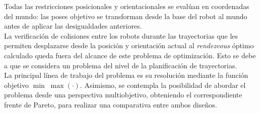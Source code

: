 
Todas las restricciones posicionales y orientacionales se evalúan en coordenadas del mundo:
las poses objetivo se transforman desde la base del robot al mundo antes de aplicar las 
desigualdades anteriores. \\

La verificación de colisiones entre los robots durante las trayectorias que les permiten 
desplazarse desde la posición y orientación actual al \textit{rendezvous} óptimo calculado 
queda fuera del alcance de este problema de optimización. Esto se debe a que se 
considera un problema del nivel de la planificación de trayectorias. \\

La principal línea de trabajo del problema es su resolución mediante la función objetivo
$\min\; \max (·)$. Asimismo, se contempla la posibilidad de abordar el problema desde 
una perspectiva multiobjetivo, obteniendo el correspondiente frente de Pareto, para realizar
una comparativa entre ambos diseños.